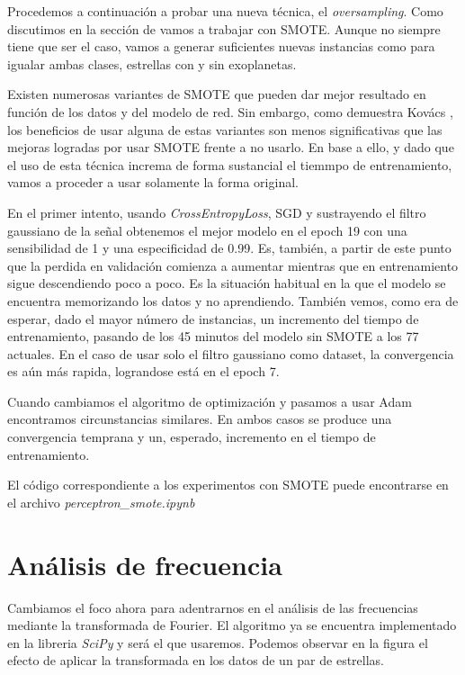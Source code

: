 Procedemos a continuación a probar una nueva técnica, el \textit{oversampling}. Como discutimos en la sección de  vamos a trabajar con SMOTE. Aunque no siempre tiene que ser el caso, vamos a generar suficientes nuevas instancias como para igualar ambas clases, estrellas con y sin exoplanetas.

Existen numerosas variantes de SMOTE que pueden dar mejor resultado en función de los datos y del modelo de red. Sin embargo, como demuestra Kovács \cite{SMOTE-comparison}, los beneficios de usar alguna de estas variantes son menos significativas que las mejoras logradas por usar SMOTE frente a no usarlo. En base a ello, y dado que el uso de esta técnica increma de forma sustancial el tiemmpo de entrenamiento, vamos a proceder a usar solamente la forma original.


En el primer intento, usando \textit{CrossEntropyLoss}, SGD y sustrayendo el filtro gaussiano de la señal obtenemos el mejor modelo en el epoch 19 con una sensibilidad de 1 y una especificidad de 0.99. Es, también, a partir de este punto que la perdida en validación comienza a aumentar mientras que en entrenamiento sigue descendiendo poco a poco. Es la situación habitual en la que el modelo se encuentra memorizando los datos y no aprendiendo. También vemos, como era de esperar, dado el mayor número de instancias, un incremento del tiempo de entrenamiento, pasando de los 45 minutos del modelo sin SMOTE a los 77 actuales. En el caso de usar solo el filtro gaussiano como dataset, la convergencia es aún más rapida, lograndose está en el epoch 7.

Cuando cambiamos el algoritmo de optimización y pasamos a usar Adam encontramos circunstancias similares. En ambos casos se produce una convergencia temprana y un, esperado, incremento en el tiempo de entrenamiento.

El código correspondiente a los experimentos con SMOTE puede encontrarse en el archivo \textit{perceptron\_smote.ipynb}

\section{Análisis de frecuencia}

Cambiamos el foco ahora para adentrarnos en el análisis de las frecuencias mediante la transformada de Fourier. El algoritmo ya se encuentra implementado en la libreria \textit{SciPy} y será el que usaremos. Podemos observar en la figura  el efecto de aplicar la transformada en los datos de un par de estrellas.  

